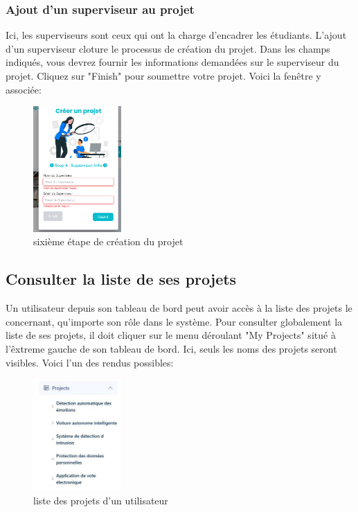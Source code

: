 \documentclass[12pt]{article}
\begin{document}
\medskip
\subsubsection{Ajout d'un superviseur au projet}
Ici, les superviseurs sont ceux qui ont la charge d'encadrer les étudiants. L'ajout d'un superviseur cloture le processus de création du projet. Dans les champs indiqués, vous devrez fournir les informations demandées sur le superviseur du projet. Cliquez sur "Finish" pour soumettre votre projet. Voici la fenêtre y associée:
\begin{figure}[h!]
\centering
\includegraphics[width=0.3\textwidth]{images/etape6-projet.png}
\caption{ sixième étape de création du projet}
\label{fig:etape6projet}
\end{figure}
 
\bigskip
\subsection{Consulter la liste de ses projets}
Un utilisateur depuis son tableau de bord peut avoir accès à la liste des projets le concernant, qu'importe son rôle dans le système. Pour consulter globalement la liste de ses projets, il doit cliquer sur le menu déroulant "My Projects" situé à l'êxtreme gauche de son tableau de bord. Ici, seuls les noms des projets seront visibles. Voici l'un des rendus possibles:
    \begin{figure}[h!]
        \centering
        \includegraphics[width=0.3\textwidth]{images/min-project-list.jpg}
        \caption{liste des projets d'un utilisateur}
        \label{fig:liste des projets d'un utilsateur}
    \end{figure}
\end{document}
